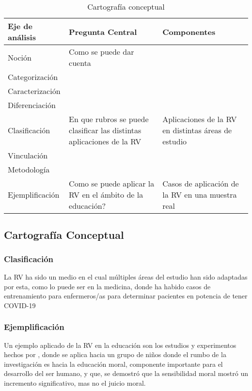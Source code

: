 \begin{table}[!h]
   \caption{Cartografía conceptual}
   \begin{tabular}{p{4cm}|p{4cm}|p{4cm}}
      Eje de análisis & Pregunta Central & Componentes\\
      \hline
      Noción & Como se puede dar cuenta &\\
      Categorización & &\\
      Caracterización & &\\
      Diferenciación & &\\
      Clasificación & En que rubros se puede clasificar las distintas aplicaciones de la RV & Aplicaciones de la RV en distintas áreas de estudio\\
      Vinculación & &\\
      Metodología & &\\
      Ejemplificación & Como se puede aplicar la RV en el ámbito de la educación? & Casos de aplicación de la RV en una muestra real\\
   \end{tabular}
\end{table}

\subsection{Cartografía Conceptual}

\subsubsection{Clasificación}

La RV ha sido un medio en el cual múltiples áreas del estudio han sido adaptadas por esta, como lo puede ser en la medicina, donde ha habido casos de entrenamiento para enfermeros/as para determinar pacientes en potencia de tener COVID-19 \cite{GUERRERO2022100002}

\subsubsection{Ejemplificación}

Un ejemplo aplicado de la RV en la educación son los estudios y experimentos hechos por \cite{SHIM2023100010}, donde se aplica hacia un grupo de niños donde el rumbo de la investigación es hacia la educación moral, componente importante para el desarrollo del ser humano, y que, se demostró que la sensibilidad moral mostró un incremento significativo, mas no el juicio moral.
